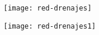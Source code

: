 \documentclass[14pt]{beamer}
\begin{document}
\begin{frame}
 \begin{figure}
    \centering
    \texttt{[image: red-drenajes]}
  \end{figure}
\end{frame}
\begin{frame}
 \begin{figure}
    \centering
    \texttt{[image: red-drenajes1]}
  \end{figure}
\end{frame}
\end{document}
